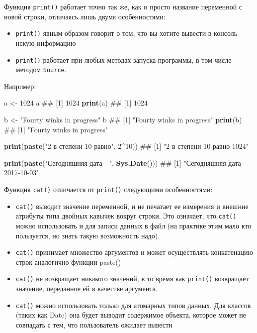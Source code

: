 \documentclass[]{book}
\newenvironment{Shaded}{\begin{snugshade}}{\end{snugshade}}
\newcommand{\KeywordTok}[1]{\textcolor[rgb]{0.13,0.29,0.53}{\textbf{#1}}}
\newcommand{\DecValTok}[1]{\textcolor[rgb]{0.00,0.00,0.81}{#1}}
\newcommand{\StringTok}[1]{\textcolor[rgb]{0.31,0.60,0.02}{#1}}
\newcommand{\OperatorTok}[1]{\textcolor[rgb]{0.81,0.36,0.00}{\textbf{#1}}}
\newcommand{\NormalTok}[1]{#1}
\providecommand{\tightlist}{%
  \setlength{\itemsep}{0pt}\setlength{\parskip}{0pt}}
\begin{document}
Функция \texttt{print()} работает точно так же, как и просто название
переменной с новой строки, отличаясь лишь двумя особенностями:

\begin{itemize}
\tightlist
\item
  \texttt{print()} явным образом говорит о том, что вы хотите вывести в
  консоль некую информацию
\item
  \texttt{print()} работает при любых методах запуска программы, в том
  числе методом \texttt{Source}.
\end{itemize}

Например:

\begin{Shaded}
\begin{Highlighting}[]
\NormalTok{a <-}\StringTok{ }\DecValTok{1024}
\NormalTok{a}
\NormalTok{## [1] 1024}
\KeywordTok{print}\NormalTok{(a)}
\NormalTok{## [1] 1024}

\NormalTok{b <-}\StringTok{ "Fourty winks in progress"}
\NormalTok{b}
\NormalTok{## [1] "Fourty winks in progress"}
\KeywordTok{print}\NormalTok{(b)}
\NormalTok{## [1] "Fourty winks in progress"}

\KeywordTok{print}\NormalTok{(}\KeywordTok{paste}\NormalTok{(}\StringTok{"2 в степени 10 равно"}\NormalTok{, }\DecValTok{2}\OperatorTok{^}\DecValTok{10}\NormalTok{))}
\NormalTok{## [1] "2 в степени 10 равно 1024"}

\KeywordTok{print}\NormalTok{(}\KeywordTok{paste}\NormalTok{(}\StringTok{"Сегодняшняя дата - "}\NormalTok{, }\KeywordTok{Sys.Date}\NormalTok{()))}
\NormalTok{## [1] "Сегодняшняя дата -  2017-10-03"}
\end{Highlighting}
\end{Shaded}

Функция \texttt{cat()} отличается от \texttt{print()} следующими
особенностями:

\begin{itemize}
\tightlist
\item
  \texttt{cat()} выводит значение переменной, и не печатает ее измерения
  и внешние атрибуты типа двойных кавычек вокруг строки. Это означает,
  что \texttt{cat()} можно использовать и для записи данных в файл (на
  практике этим мало кто пользуется, но знать такую возможность надо).
\item
  \texttt{cat()} принимает множество аргументов и может осуществлять
  конкатенацию строк аналогично функции paste()
\item
  \texttt{cat()} не возвращает никакого значений, в то время как
  \texttt{print()} возвращает значение, переданное ей в качестве
  аргумента.
\item
  \texttt{cat()} можно использовать только для атомарных типов данных.
  Для классов (таких как Date) она будет выводит содержимое объекта,
  которое может не совпадать с тем, что пользователь ожидает вывести
\end{itemize}
\end{document}
